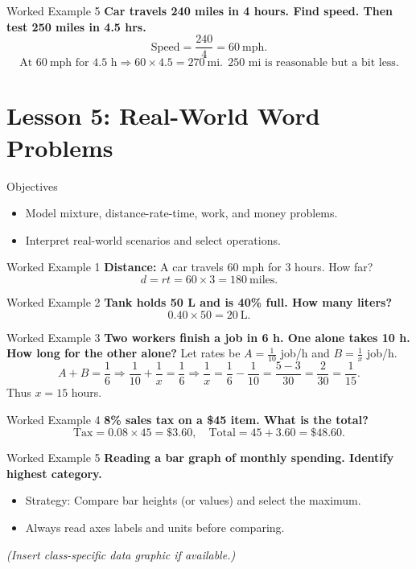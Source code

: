 \documentclass[aspectratio=169]{beamer}
\begin{document}
\begin{frame}{Worked Example 5}
\textbf{Car travels 240 miles in 4 hours. Find speed. Then test 250 miles in 4.5 hrs.}
\[
\text{Speed} = \frac{240}{4}=60\ \text{mph}.
\]
\[
\text{At }60\ \text{mph for }4.5\text{ h} \Rightarrow 60\times 4.5 = 270\ \text{mi}. \ \ 250\text{ mi is reasonable but a bit less.}
\]
\end{frame}

\section{Lesson 5: Real-World Word Problems}

\begin{frame}{Objectives}
\begin{itemize}
  \item Model mixture, distance-rate-time, work, and money problems.
  \item Interpret real-world scenarios and select operations.
\end{itemize}
\end{frame}

\begin{frame}{Worked Example 1}
\textbf{Distance: } A car travels 60 mph for 3 hours. How far?
\[
d=rt=60\times 3 = 180\ \text{miles}.
\]
\end{frame}

\begin{frame}{Worked Example 2}
\textbf{Tank holds 50 L and is 40\% full. How many liters?}
\[
0.40 \times 50 = 20\ \text{L}.
\]
\end{frame}

\begin{frame}{Worked Example 3}
\textbf{Two workers finish a job in 6 h. One alone takes 10 h. How long for the other alone?}
Let rates be \(A=\frac{1}{10}\) job/h and \(B=\frac{1}{x}\) job/h.
\[
A+B=\frac{1}{6} \Rightarrow \frac{1}{10} + \frac{1}{x} = \frac{1}{6}
\Rightarrow \frac{1}{x} = \frac{1}{6}-\frac{1}{10}=\frac{5-3}{30}=\frac{2}{30}=\frac{1}{15}.
\]
Thus \(x=15\) hours.
\end{frame}

\begin{frame}{Worked Example 4}
\textbf{8\% sales tax on a \$45 item. What is the total?}
\[
\text{Tax} = 0.08\times 45 = \$3.60,\quad \text{Total} = 45 + 3.60 = \$48.60.
\]
\end{frame}

\begin{frame}{Worked Example 5}
\textbf{Reading a bar graph of monthly spending. Identify highest category.}
\begin{itemize}
  \item Strategy: Compare bar heights (or values) and select the maximum.
  \item Always read axes labels and units before comparing.
\end{itemize}
\textit{(Insert class-specific data graphic if available.)}
\end{frame}
\end{document}
